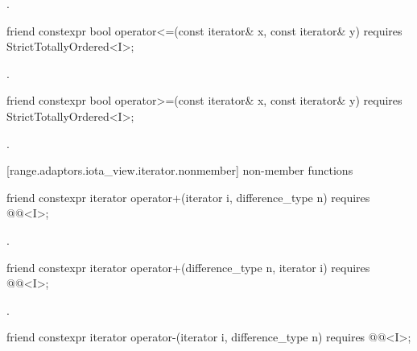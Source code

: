 \begin{itemdescr}
\pnum
\returns {}.
\end{itemdescr}

\begin{itemdecl}
friend constexpr bool operator<=(const iterator& x, const iterator& y)
  requires StrictTotallyOrdered<I>;
\end{itemdecl}

\begin{itemdescr}
\pnum
\returns {}.
\end{itemdescr}

\begin{itemdecl}
friend constexpr bool operator>=(const iterator& x, const iterator& y)
  requires StrictTotallyOrdered<I>;
\end{itemdecl}

\begin{itemdescr}
\pnum
\returns {}.
\end{itemdescr}

[range.adaptors.iota_view.iterator.nonmember]{ non-member functions}

\begin{itemdecl}
friend constexpr iterator operator+(iterator i, difference_type n)
  requires @@<I>;
\end{itemdecl}

\begin{itemdescr}
\pnum
\returns {}.
\end{itemdescr}

\begin{itemdecl}
friend constexpr iterator operator+(difference_type n, iterator i)
  requires @@<I>;
\end{itemdecl}

\begin{itemdescr}
\pnum
\returns {}.
\end{itemdescr}

\begin{itemdecl}
friend constexpr iterator operator-(iterator i, difference_type n)
  requires @@<I>;
\end{itemdecl}

